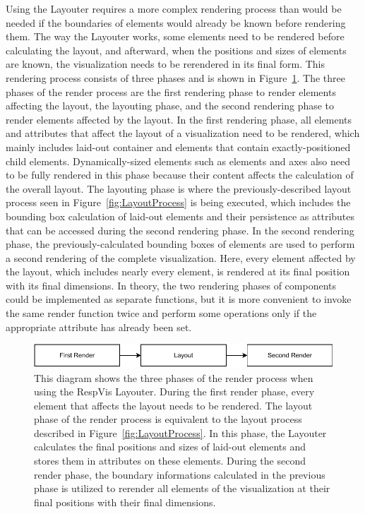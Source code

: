Using the Layouter requires a more complex rendering process than
would be needed if the boundaries of elements would already be known
before rendering them.  The way the Layouter works, some elements need
to be rendered before calculating the layout, and afterward, when the
positions and sizes of elements are known, the visualization needs to
be rerendered in its final form.  This rendering process consists of
three phases and is shown in Figure~\ref{fig:RenderProcess}.  The
three phases of the render process are the first rendering phase to
render elements affecting the layout, the layouting phase, and the
second rendering phase to render elements affected by the layout.  In
the first rendering phase, all elements and attributes that affect the
layout of a visualization need to be rendered, which mainly includes
laid-out container  and  elements that contain
exactly-positioned child elements.  Dynamically-sized elements such as
 elements and axes also need to be fully rendered in this
phase because their content affects the calculation of the overall
layout.  The layouting phase is where the previously-described layout
process seen in Figure~\ref{fig:LayoutProcess} is being executed,
which includes the bounding box calculation of laid-out elements and
their persistence as attributes that can be accessed during the second
rendering phase.  In the second rendering phase, the
previously-calculated bounding boxes of elements are used to perform a
second rendering of the complete visualization.  Here, every element
affected by the layout, which includes nearly every element, is
rendered at its final position with its final dimensions.  In theory,
the two rendering phases of components could be implemented as
separate functions, but it is more convenient to invoke the same
render function twice and perform some operations only if the
appropriate  attribute has already been set.


\begin{figure}[tp]
\centering
\includegraphics[keepaspectratio,width=\linewidth,height=\fullh]
{diagrams/respvis-render-process.pdf}
\caption[Render Process When Using the Layouter]{%
This diagram shows the three phases of the render process when using
the RespVis Layouter.  During the first render phase, every element
that affects the layout needs to be rendered.  The layout phase of the
render process is equivalent to the layout process described in
Figure~\ref{fig:LayoutProcess}. In this phase, the Layouter
calculates the final positions and sizes of laid-out elements and
stores them in attributes on these elements.  During the second render
phase, the boundary informations calculated in the previous phase is
utilized to rerender all elements of the visualization at their final
positions with their final dimensions.  
}
\label{fig:RenderProcess}
\end{figure}




